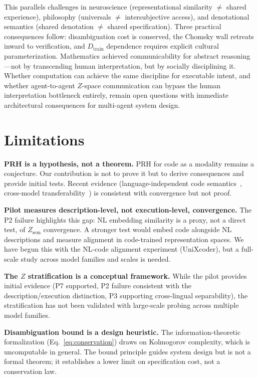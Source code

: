 \documentclass{article}
\theoremstyle{definition}
\newcommand{\Zsem}{Z_{\text{sem}}}
\newcommand{\Dtrain}{D_{\text{train}}}
\begin{document}
This parallels challenges in neuroscience (representational similarity $\neq$ shared experience), philosophy (universals $\neq$ intersubjective access), and denotational semantics (shared denotation $\neq$ shared specification). Three practical consequences follow: disambiguation cost is conserved, the Chomsky wall retreats inward to verification, and $\Dtrain$ dependence requires explicit cultural parameterization. Mathematics achieved communicability for abstract reasoning---not by transcending human interpretation, but by socially disciplining it. Whether computation can achieve the same discipline for executable intent, and whether agent-to-agent $Z$-space communication can bypass the human interpretation bottleneck entirely, remain open questions with immediate architectural consequences for multi-agent system design.


\section*{Limitations}

\textbf{PRH is a hypothesis, not a theorem.} PRH for code as a modality remains a conjecture. Our contribution is not to prove it but to derive consequences and provide initial tests. Recent evidence (language-independent code semantics~\citep{beyondsyntax2025}, cross-model transferability~\citep{chen2025crossmodel}) is consistent with convergence but not proof.

\textbf{Pilot measures description-level, not execution-level, convergence.} The P2 failure highlights this gap: NL embedding similarity is a proxy, not a direct test, of $\Zsem$ convergence. A stronger test would embed code alongside NL descriptions and measure alignment in code-trained representation spaces. We have begun this with the NL-code alignment experiment (UniXcoder), but a full-scale study across model families and scales is needed.

\textbf{The $Z$ stratification is a conceptual framework.} While the pilot provides initial evidence (P7 supported, P2 failure consistent with the description/execution distinction, P3 supporting cross-lingual separability), the stratification has not been validated with large-scale probing across multiple model families.

\textbf{Disambiguation bound is a design heuristic.} The information-theoretic formalization (Eq.~\ref{eq:conservation}) draws on Kolmogorov complexity, which is uncomputable in general. The bound principle guides system design but is not a formal theorem; it establishes a lower limit on specification cost, not a conservation law.
\end{document}
